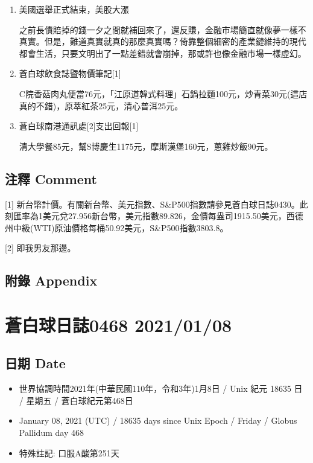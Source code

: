 \documentclass[a5paper, 11pt
]{book}
\providecommand{\tightlist}{%
  \setlength{\itemsep}{0pt}\setlength{\parskip}{0pt}}
\begin{document}
\begin{enumerate}
\def\labelenumi{\arabic{enumi}.}
\item
  美國選舉正式結束，美股大漲

  之前長債賠掉的錢一夕之間就補回來了，還反賺，金融市場簡直就像夢一樣不真實。但是，難道真實就真的那麼真實嗎？倚靠整個細密的產業鏈維持的現代都會生活，只要文明出了一點差錯就會崩掉，那或許也像金融市場一樣虛幻。
\item
  蒼白球飲食誌暨物價筆記{[}1{]}

  C院香菇肉丸便當76元，「江原道韓式料理」石鍋拉麵100元，炒青菜30元(這店真的不錯)，原萃紅茶25元，清心普洱25元。
\item
  蒼白球南港通訊處{[}2{]}支出回報{[}1{]}

  清大學餐85元，幫S博慶生1175元，摩斯漢堡160元，蔥雞炒飯90元。
\end{enumerate}

\hypertarget{ux6ce8ux91cb-comment-37}{%
\subsection{注釋 Comment}\label{ux6ce8ux91cb-comment-37}}

{[}1{]}
新台幣計價。有關新台幣、美元指數、S\&P500指數請參見蒼白球日誌0430。此刻匯率為1美元兌27.956新台幣，美元指數89.826，金價每盎司1915.50美元，西德州中級(WTI)原油價格每桶50.92美元，S\&P500指數3803.8。

{[}2{]} 即我男友那邊。

\hypertarget{ux9644ux9304-appendix-37}{%
\subsection{附錄 Appendix}\label{ux9644ux9304-appendix-37}}

\hypertarget{ux84bcux767dux7403ux65e5ux8a8c0468-20210108}{%
\section{蒼白球日誌0468
2021/01/08}\label{ux84bcux767dux7403ux65e5ux8a8c0468-20210108}}

\hypertarget{ux65e5ux671f-date-38}{%
\subsection{日期 Date}\label{ux65e5ux671f-date-38}}

\begin{itemize}
\tightlist
\item
  世界協調時間2021年(中華民國110年，令和3年)1月8日 / Unix 紀元 18635 日
  / 星期五 / 蒼白球紀元第468日
\item
  January 08, 2021 (UTC) / 18635 days since Unix Epoch / Friday / Globus
  Pallidum day 468
\item
  特殊註記: 口服A酸第251天
\end{itemize}
\end{document}
